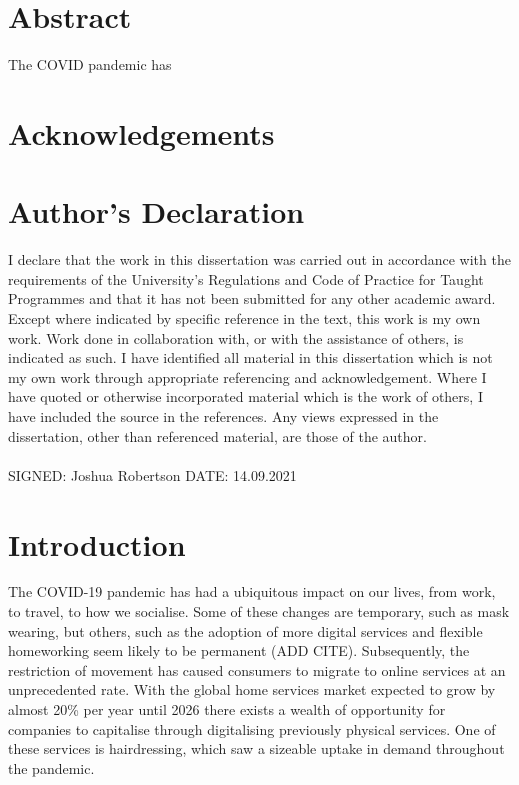 \documentclass[12pt]{article}
\begin{document}
	\section*{Abstract}
	The COVID pandemic has
	
	\pagebreak

	\section*{Acknowledgements}
	\pagebreak
	
	\section*{Author's Declaration}

	I declare that the work in this dissertation was carried out in accordance with the 
	requirements of the University’s Regulations and Code of Practice for Taught Programmes 
	and that it has not been submitted for any other academic award.  Except where indicated 
	by specific reference in the text, this work is my own work. Work done in collaboration with, 
	or with the assistance of others, is indicated as such. I have identified all material in this 
	dissertation which is not my own work through appropriate referencing and 
	acknowledgement. Where I have quoted or otherwise incorporated material which is the 
	work of others, I have included the source in the references.  Any views expressed in the 
	dissertation, other than referenced material, are those of the author. 
	\\
	\\
	SIGNED: Joshua Robertson DATE: 14.09.2021 
	
	\pagebreak
	
	{
		\hypersetup{linkcolor=black}
		\tableofcontents
		\pagebreak
	
		\listoffigures
		\pagebreak
	}
	
	
	\section{Introduction}


	
	
	The COVID-19 pandemic has had a ubiquitous impact on our lives, from work, to travel, to how we socialise. Some of these changes are temporary, such as mask wearing, but others, such as the adoption of more digital services and flexible homeworking seem likely to be permanent (ADD CITE). 
	Subsequently, the restriction of movement has caused consumers to migrate to online services at an unprecedented rate. With the global home services market expected to grow by almost 20\% per year until 2026 \cite{ray28StatisticsHome2021} there exists a wealth of opportunity for companies to capitalise through digitalising previously physical services. One of these services is hairdressing, which saw a sizeable uptake in demand throughout the pandemic. 
	\\
	
\end{document}
